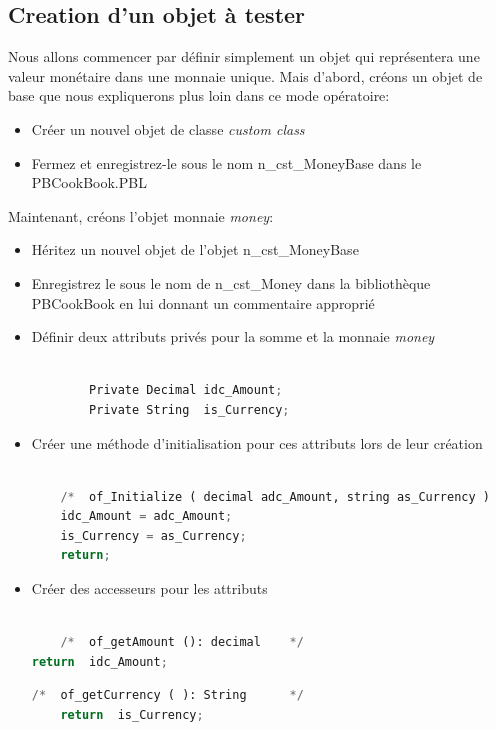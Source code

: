\documentclass[a4paper,11pt,french]{report}
\theoremstyle{definition}
\begin{document}
\subsection{Creation d'un objet à tester}
Nous allons commencer par définir simplement un objet  qui représentera une valeur monétaire dans une monnaie unique. 
Mais d'abord, créons un objet de base que nous expliquerons plus loin dans ce mode opératoire:
\begin{itemize}
    \item Créer un nouvel objet de classe \textit{custom class}
    \item Fermez et enregistrez-le sous le nom n\_cst\_MoneyBase dans le PBCookBook.PBL
\end{itemize}
Maintenant, créons l'objet monnaie \textit{money}:
\begin{itemize}
   \item Héritez un nouvel objet de l'objet n\_cst\_MoneyBase
    \item Enregistrez le sous le nom de n\_cst\_Money dans la bibliothèque PBCookBook en lui donnant un commentaire approprié
    \item  Définir deux attributs privés pour la somme et la monnaie \textit{money}

\begin{lstlisting}[language=Python, caption=variable d'instance de n\_cst\_money]
    
        Private Decimal	idc_Amount;
        Private String	is_Currency;

\end{lstlisting}
\item Créer une méthode d'initialisation pour ces attributs lors de leur création

\begin{lstlisting}[language=Python, caption=methode d'initialisation  de n\_cst\_money]
    
    /*	of_Initialize ( decimal adc_Amount, string as_Currency )	*/
    idc_Amount = adc_Amount;
    is_Currency = as_Currency;
    return;
\end{lstlisting}
\item  Créer des accesseurs pour les attributs
\begin{lstlisting}[language=Python, caption=accesseur pour recuperer la somme de l'objet \textit{money}]
    
    /*	of_getAmount (): decimal	*/
return	idc_Amount;

\end{lstlisting}
\begin{lstlisting}[language=Python, caption=accesseur pour recuperer la monnaie de l'objet \textit{money}]
    /*	of_getCurrency ( ): String		*/
    return	is_Currency;
    

\end{lstlisting}
\end{itemize}
\end{document}
